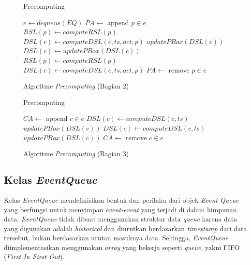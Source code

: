 \begin{figure}[H]
	\begin{algorithm}[H]
		\caption{Precomputing}
		\begin{algorithmic}[1]
			\State $e \leftarrow dequeue(EQ)$
			\State $PA \leftarrow$ append $p \in e$
			\State $RSL(p) \leftarrow computeRSL(p)$
			\State $DSL(c) \leftarrow computeDSL(c, ts, act, p)$
			\EndFor
			\State $updatePBox(DSL(c))$
			\EndFor
			\State $DSL(c) \leftarrow updatePBox(DSL(c))$
			\EndFor
			\State $RSL(p) \leftarrow computeRSL(p)$
			\State $DSL(c) \leftarrow computeDSL(c, ts, act, p)$
			\EndFor
			\State $PA \leftarrow$ remove $p \in e$
			\EndIf
		\end{algorithmic}
	\end{algorithm}
	\caption{Algoritme \textit{Precomputing} (Bagian 2) \label{algo:main-func-2}}
\end{figure}
			
\begin{figure}[H]
	\begin{algorithm}[H]
		\caption{Precomputing}
		\begin{algorithmic}[1]
			\State $CA \leftarrow$ append $c \in e$ 
			\State $DSL(c) \leftarrow computeDSL(c, ts)$
			\State $updatePBox(DSL(c))$
			\State $DSL(c) \leftarrow computeDSL(c, ts)$
			\State $updatePBox(DSL(c))$
			\State $CA \leftarrow$ remove $c \in e$ 
			\EndIf
			\EndIf
			\EndWhile
		\end{algorithmic}
	\end{algorithm}
	\caption{Algoritme \textit{Precomputing} (Bagian 3) \label{algo:main-func-3}}
\end{figure}

\subsection{Kelas \textit{EventQueue}}
\tab Kelas \textit{EventQueue} mendefinisikan bentuk dan perilaku dari objek \textit{Event Queue} yang berfungsi untuk menyimpan \textit{event-event} yang terjadi di dalam himpunan data. \textit{EventQueue} tidak dibuat menggunakan struktur data \textit{queue} karena data yang digunakan adalah \textit{historical} dan diurutkan berdasarkan \textit{timestamp} dari data tersebut, bukan berdasarkan urutan masuknya data. Sehingga, \textit{EventQueue} diimplementasikan menggunakan \textit{array} yang bekerja seperti \textit{queue}, yakni FIFO (\textit{First In First Out}). 

